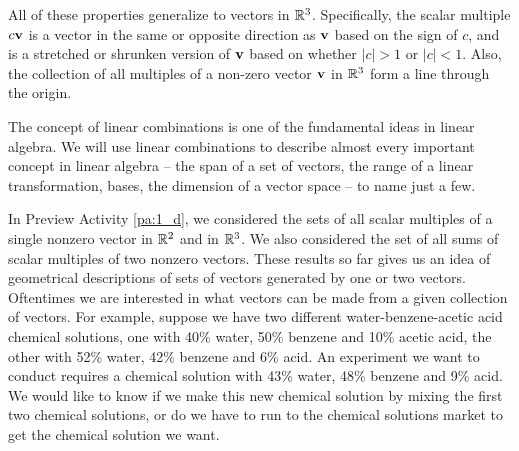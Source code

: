 All of these properties generalize to vectors in $\mathbb{R}^3$. Specifically, the scalar multiple $c\mathbf{v}$ is a vector in the same or opposite direction as $\mathbf{v}$ based on the sign of $c$, and is a stretched or shrunken version of $\mathbf{v}$ based on whether $|c|>1$ or $|c|<1$. Also, the collection of all multiples of a non-zero vector $\mathbf{v}$ in $\mathbb{R}^3$ form a line through the origin.


The concept of linear combinations is one of the fundamental ideas in linear algebra. We will use linear combinations to describe almost every important concept in linear algebra -- the span of a set of vectors, the range of a linear transformation, bases, the dimension of a vector space -- to name just a few. 

In Preview Activity \ref{pa:1_d}, we considered the sets of all scalar multiples of a single nonzero vector in $\mathbb{R}^2$ and in $\mathbb{R}^3$. We also considered the set of all sums of scalar multiples of two nonzero vectors. These results so far gives us an idea of geometrical descriptions of sets of vectors generated by one or two vectors. 
Oftentimes we are interested in what vectors can be made from a given collection of vectors. For example, suppose we have two different water-benzene-acetic acid chemical solutions, one with 40\% water, 50\% benzene and 10\% acetic acid, the other with 52\% water, 42\% benzene and 6\% acid. An experiment we want to conduct requires a chemical solution with 43\% water, 48\% benzene and 9\% acid. We would like to know if we make this new chemical solution by mixing the first two chemical solutions, or do we have to run to the chemical solutions market to get the chemical solution we want.

